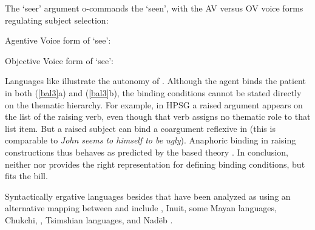 \documentclass[output=paper
 	        ,biblatex
                ,babelshorthands
                ,newtxmath
                ,draftmode
                ,colorlinks, citecolor=brown
]{langscibook}
\begin{document}
\noindent
The `seer' argument o-commands the `seen', with the AV versus
OV voice forms regulating subject selection:

\begin{exe} 
	\label{avsee}
\ex	Agentive Voice form of `see': \\
\end{exe}

\begin{exe} 
	\label{ovsee}
\ex	Objective Voice form of `see': \\
\end{exe}

\noindent
Languages like  illustrate the autonomy of \argst.  Although the agent binds the
patient in both (\ref{bal3}a) and (\ref{bal3}b), the binding conditions cannot be stated directly on
the thematic hierarchy.  For example, in HPSG a raised
argument appears on the \argst list of the raising verb, even though that verb assigns no thematic
role to that list item.
But a raised subject can bind a coargument reflexive in  (this is comparable to
 \textit{John seems to himself to be ugly}).  Anaphoric binding in 
raising constructions thus behaves as predicted by the \argst based theory \citep{Wechsler1999}.  In
conclusion, neither  nor \content provides the right representation for defining binding
conditions, but \argst fits the bill.


Syntactically ergative languages besides  that have been analyzed as using an
alternative mapping between \argst and  include , Inuit, some Mayan languages,
Chukchi, , Tsimshian languages, and Nad{\"e}b \citep{Manning1996,Manning+Sag:1999}.
\end{document}
